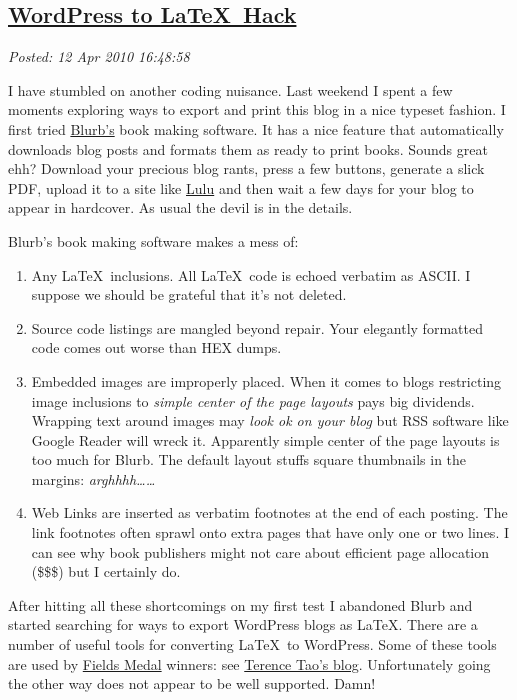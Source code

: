 %

\subsection*{\href{http://bakerjd99.wordpress.com/2010/04/12/wordpress-to-latex-hack/}{WordPress to \LaTeX\ Hack}}


\noindent\emph{Posted: 12 Apr 2010 16:48:58}
\vspace{6pt}

I have stumbled on another coding nuisance. Last weekend I spent a few
moments exploring ways to export and print this blog in a nice typeset
fashion. I first tried
\href{http://www.blurb.com/?ce=google\_brand\_blurb\&gclid=CPWP3fHHgaECFQhinAodnw-Twg}{Blurb's}
book making software. It has a nice feature that automatically downloads
blog posts and formats them as ready to print books. Sounds great ehh?
Download your precious blog rants, press a few buttons, generate a slick
PDF, upload it to a site like \href{http://www.lulu.com/}{Lulu} and then
wait a few days for your blog to appear in hardcover. As usual the devil
is in the details.

Blurb's book making software makes a mess of:

\begin{enumerate}
\item
  Any \LaTeX\ inclusions. All \LaTeX\ code is echoed
  verbatim as ASCII. I suppose we should be grateful that it's not
  deleted.
\item
  Source code listings are mangled beyond repair. Your elegantly
  formatted code comes out worse than HEX dumps.
\item
  Embedded images are improperly placed. When it comes to blogs
  restricting image inclusions to \emph{simple center of the page
  layouts} pays big dividends. Wrapping text around images may
  \emph{look ok on your blog} but RSS software like Google Reader will
  wreck it. Apparently simple center of the page layouts is too much for
  Blurb. The default layout stuffs square thumbnails in the margins:
  \emph{arghhhh\ldots{}\ldots{}}
\item
  Web Links are inserted as verbatim footnotes at the end of each
  posting. The link footnotes often sprawl onto extra pages that have
  only one or two lines. I can see why book publishers might not care
  about efficient page allocation (\$\$\$) but I certainly do.
\end{enumerate}
After hitting all these shortcomings on my first test I abandoned Blurb
and started searching for ways to export WordPress blogs as
\LaTeX. There are a number of useful tools for converting
\LaTeX\ to WordPress. Some of these tools are used by
\href{http://mathworld.wolfram.com/FieldsMedal.html}{Fields Medal}
winners: see \href{http://terrytao.wordpress.com/}{Terence Tao's blog}.
Unfortunately going the other way does not appear to be well supported.
Damn!

